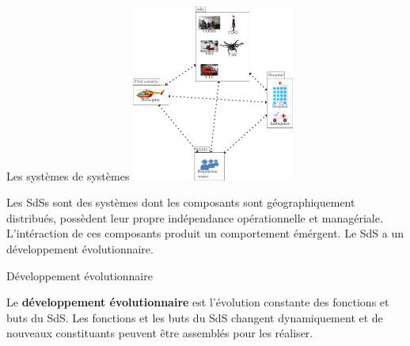 

\begin{frame}{Les systèmes de systèmes}
\centering 
\includegraphics[width=0.4\textwidth, height=0.3\textwidth]{imgs/fig_sos_overview.pdf}
\begin{definition}
 Les SdSs sont des systèmes dont les composants sont géographiquement
distribués, possèdent leur propre indépendance opérationnelle et
managériale. 
L'intéraction de ces composants produit un comportement émérgent. Le
SdS a un développement évolutionnaire. 
\end{definition}
\end{frame}

\begin{frame}{Développement évolutionnaire}
\begin{definition}{}
Le \textbf{développement évolutionnaire} est l'évolution constante des
fonctions et buts du SdS. Les fonctions et les buts du SdS changent
dynamiquement et de nouveaux constituants peuvent être assemblés pour
les réaliser.
\end{definition}

\end{frame}

